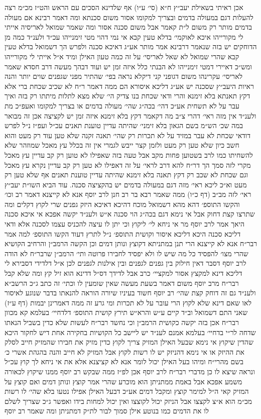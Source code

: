 \documentclass[12pt, openany]{book}
\begin{document}
\begin{multicols}{2}
אכן ראיתי בשאילת יעב״ץ ח״א (סי׳ ע״ו) אף שלדינא הסכים עם הראש והט״ז מכ״מ רצה להעלות דגם במעולה בדמים ובצריך למקומו אסור משום סכנתא ומה דאמר רבינא אם מעולה בדמים מותר רק משום ל״ת קאמר אבל משום סכנה אסור ומה שאמר שמואל לאריסיה אייתי לי מקורייהו איכא לאוקמי׳ בדלא טעין קבא אי נמי דהוי מטי זימנייהו עכ״ד ולענ״ד כמה מן הדוחקים יש בזה שנאמר דרבינא אמר מותר אע״ג דאיכא סכנה ולפרש הך דשמואל בדלא טעין קבא שהרי שמואל לא שאל לאריסי׳ על זה כמה טעון האילן ומיד א״ל אייתי לי מקורייהו ומש״כ דאיירי דמטי זימנייהו לא הבנתי כלל איזה זמן יש ועוד דבהך מעשה דרב חסדא שאמר לאריסי׳ עקרינהו משום דגופני קני דיקלא נראה בפי׳ שהתיר מפני שגפנים שוים יותר והנה ראיות היעב״ץ שסכנה יש אע״ג דליכא איסורא הם ממה דאמר ר״ח לא שכיב שכחת ברי אלא דקץ תאנתא בלא זימנא והרי ודאי שכחת בנו צדיק הי׳ שלא מצא לתלות מיתתו רק בזה ואיך עבר על לא תשחית אע״כ דהי׳ בכה״ג שהי׳ מעולה בדמים או בצריך למקומו ואעפ״כ מת ולענ״ד אין מזה ראי׳ דהרי צ״ב מה דקאמר דקץ בלא זימנא איזה זמן יש לקציצה אכן זה מבואר במה שכ׳ הש״מ בשם הגאון בלא זימני׳ שהיתה עדיין טוענת תאנים עכ״ל ועפ״ז נ״ל לפרש דודאי שכחת לא עבר במזיד על לא תכרות רק שהי׳ תאנה זקנה שלא טען עוד רק מעט והוא חשב כיון שלא טען רק מעט ולזמן קצר ייבש לגמרי אין זה בכלל עץ מאכל שמוזהר שלא להשחיתו כמו לרב בשטוען פחות מקב אבל טעה בזה שאפילו לא טוען רק קב עדיין עץ מאכל מקרי לזה סמך הך דר״ח להא דרב לראי׳ על זה דאפילו לא טען רק קב עדיין נקרא עץ מאכל וגם שכחת לא שכב רק דקץ תאנה בלא זימנא שהיתה עדיין טוענת תאנים אף שלא טען רק מעט וא״כ ליכא ראי׳ מזה דגם במעולה בדמים יש בהקציצה סכנה. עוד הביא השו״ת יעב״ץ ראי׳ לזה מב״ב (דף כ״ו) ממה שאמר רבא בר רב חנן לרב יוסף אנא לא קייצנא דאמר רב וכו׳ והקשו התוספ׳ דהא מהא דשמואל מוכח דהיכא דאיכא היזק גפנים שרי לקוץ דקלים ומה שתרצו קצת דחוק אבל אי נימא דגם בכה״ג הוי סכנה א״ש ולענ״ד יקשה אפכא אי איכא סכנה היאך אמר לרב יוסף מר אי ניחא לי׳ ליקוץ וכי יתן לו עיצה להכניס עצמו לסכנה אלא ודאי דליכא סכנה היכא דליכא איסור וקושית התוספ׳ נ״ל לתרץ דעוד הקשו התוספ׳ למה אמר רבר״ח אנא לא קייצנא הרי תנן במתניתא דקוצץ ונותן דמים וכן הקשה הרמב״ן והרחיב הקושיא שהרי מצו׳ להפסיד כל מה שיש לו ולא יפסיד לחבירו פרוטה ותי׳ הרמב״ן שרבר״ח לא הודה לרב יוסף דסבר דאין חילוק בין גפנים לגפנים ובין אילנות לגפנים לכן א״ל דלדידי דסבירא לי דליכא דינא למקצץ אסור למקציי׳ כרב אבל לדידך דס״ל דדינא הוא זיל קץ ומה שלא קבל רבר״ח מרב יוסף משום דאמר בשעת מעשה שאין שומעין לו וכתי׳ זה כתב ג״כ הרשב״א ולענ״ד גם זה דוחק קצת שהי׳ רב יוסף חשוד בעיניו שיורה הוראה להנאתו בדבר שנוגע לאיסור לאו שאם דינא שלא לקוץ הרי עובר על לא תכרות ומי גרע זה ממה דאמרינן יבמות (דף ע״ז) שאני התם דשמואל וב״ד קיים ע״ש והרא״ש תירץ קושית התוספ׳ דלדחיי׳ בעלמא קא מכוון רבר״ח אכן בזה יקשה כקושית הרמב״ן וכי נחשד רבר״ח לעשות שלא כדין בשביל הנאתו שדחה לר״י בדחיי׳ בעלמא אמנם לענ״ד יש ליישב כל הקושיות בחקירה אחת דיש לחקור היכא שהדין שיקוץ אי נימא שבעל האילן המזיק צריך לקוץ כדין מזיק את חבירו שהמזיק חייב לסלק את ההיזק או אי נימא דהניזק יש לו רשות לקוץ אבל המזיק לא חייב והנה בהגהת אשרי כ׳ בשם מהרי״ח ומיהו בעל האילן יכול לומר אנא לא קציצנא אלא את אי ניחא לך קוץ עכ״ל ונראה שיצא לו כן מדברי רבר״ח לרב יוסף אכן לפ״ז ממה שבקש רב יוסף ממנו שיקוץ לכאורה משמע אפכא אבל באמת ממתניתן הוא מוכרע שהרי אמר קוצץ ונותן דמים ואם קוצץ על המזיק קאי ה״ל למימר קוצץ ומקבל דמים אע״כ דבעל האילן אפילו נטעו בלא שהי׳ לו רשות מכ״מ הוא א״צ לקצצו אבל הניזק יכול לקוצצו ואין יכול למחות בידו ואפשר ג״כ שצריך לשלם לו את הדמים כמו בנוטע אילן סמוך לבור לת״ק דמתניתן ומה שאמר רב יוסף 
\end{multicols}
\end{document}
